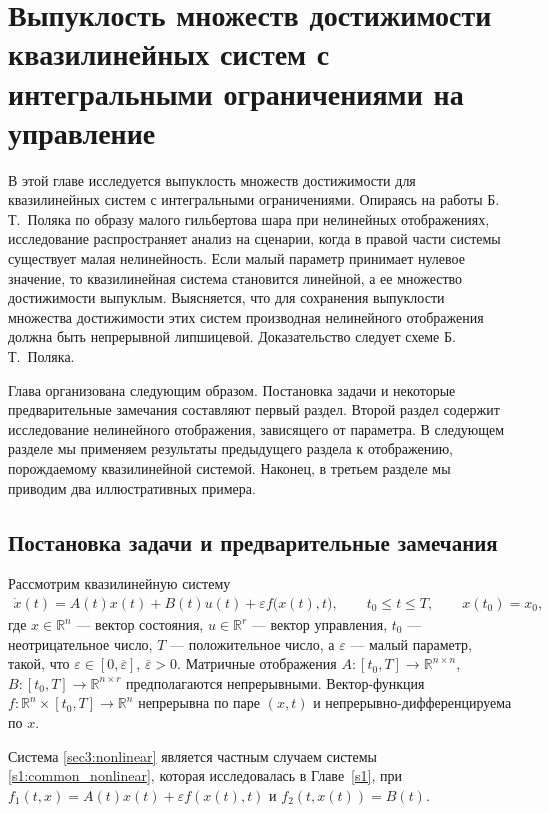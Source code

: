 \documentclass[../main.tex]{subfiles}
\begin{document}
\clearpage
\section{Выпуклость множеств достижимости квазилинейных систем с интегральными ограничениями на управление}
В этой главе исследуется выпуклость множеств достижимости для квазилинейных систем с интегральными ограничениями. 
Опираясь на работы Б.\,Т.~Поляка \cite{Polyak2001,Polyak2004} по образу малого гильбертова шара при нелинейных отображениях, исследование распространяет анализ на сценарии, когда в правой части системы существует малая нелинейность. 
Если малый параметр принимает нулевое значение, то квазилинейная система становится линейной, а ее множество достижимости выпуклым. 
Выясняется, что для сохранения выпуклости множества достижимости этих систем производная нелинейного отображения должна быть непрерывной липшицевой. 
Доказательство следует схеме Б.\,Т.~Поляка. 

Глава организована следующим образом. 
Постановка задачи и некоторые предварительные замечания составляют первый раздел. 
Второй раздел содержит исследование нелинейного отображения, зависящего от параметра. 
В следующем разделе мы применяем результаты предыдущего раздела к отображению, порождаемому квазилинейной системой. 
Наконец, в третьем разделе мы приводим два иллюстративных примера.

\subsection{Постановка задачи и предварительные замечания}

Рассмотрим квазилинейную систему
\begin{gather}\label{sec3:nonlinear}
 \dot{x}(t) = A(t)x(t)+B(t)u(t)+\varepsilon f\big(x(t),t\big), \qquad t_0 \leqslant t \leqslant T, \qquad x(t_0) = x_0,
\end{gather}
где $ x \in \mathbb{R}^n $ --- вектор состояния, $ u \in \mathbb{R}^r $ --- вектор управления, $t_0$ --- неотрицательное число, $T$ --- положительное число, а $\varepsilon$ --- малый параметр, такой, что $\varepsilon \in [0,\overline{\varepsilon}]$, $ \overline{\varepsilon} > 0$. 
Матричные отображения $A:[t_0,T] \to \mathbb{R}^{n\times n} $, $B: [t_0,T] \to \mathbb{R}^{n\times r} $ предполагаются непрерывными. 
\mbox{Вектор-функция} $f: \mathbb{R}^n \times [t_0,T] \to \mathbb{R}^n$ непрерывна по паре $(x,t)$ и непрерывно-дифференцируема по $x$.

Система \eqref{sec3:nonlinear} является частным случаем системы \eqref{s1:common_nonlinear}, которая исследовалась в Главе~\ref{s1}, при $f_1(t,x) = A(t) x(t) + \varepsilon f(x(t),t)$ и $f_2(t, x(t)) = B(t)$.
\end{document}
